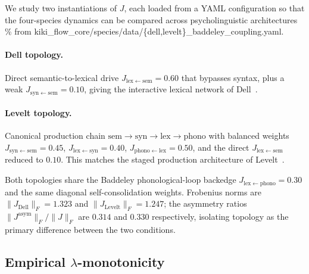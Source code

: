 \documentclass[11pt]{article}
\begin{document}
We study two instantiations of $J$, each loaded from a YAML
configuration so that the four-species dynamics can be compared across
psycholinguistic architectures~%
{\small\% from kiki\_flow\_core/species/data/\{dell,levelt\}\_baddeley\_coupling.yaml}.

\paragraph{Dell topology.}
Direct semantic-to-lexical drive
$J_{\mathrm{lex}\leftarrow\mathrm{sem}} = 0.60$ that bypasses syntax,
plus a weak $J_{\mathrm{syn}\leftarrow\mathrm{sem}} = 0.10$, giving the
interactive lexical network of Dell~\cite{dell1986}.

\paragraph{Levelt topology.}
Canonical production chain $\mathrm{sem} \to \mathrm{syn}
\to \mathrm{lex} \to \mathrm{phono}$ with balanced weights
$J_{\mathrm{syn}\leftarrow\mathrm{sem}} = 0.45$,
$J_{\mathrm{lex}\leftarrow\mathrm{syn}} = 0.40$,
$J_{\mathrm{phono}\leftarrow\mathrm{lex}} = 0.50$, and the direct
$J_{\mathrm{lex}\leftarrow\mathrm{sem}}$ reduced to $0.10$. This
matches the staged production architecture of
Levelt~\cite{levelt1999}.

Both topologies share the Baddeley phonological-loop backedge
$J_{\mathrm{lex}\leftarrow\mathrm{phono}} = 0.30$ and the same diagonal
self-consolidation weights. Frobenius norms are
$\|J_{\mathrm{Dell}}\|_F = 1.323$ and $\|J_{\mathrm{Levelt}}\|_F = 1.247$;
the asymmetry ratios $\|J^{\mathrm{asym}}\|_F / \|J\|_F$ are $0.314$
and $0.330$ respectively, isolating topology as the primary
difference between the two conditions.

\subsection{Empirical \texorpdfstring{$\lambda$}{lambda}-monotonicity}
\label{sec:lambda-mono}
\end{document}
